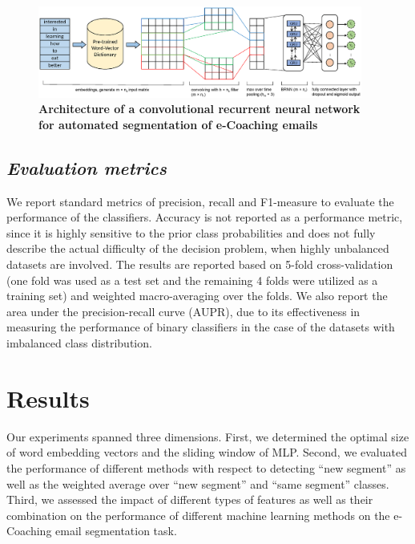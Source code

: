 \documentclass{amia}
\begin{document}
\begin{figure}[!htb]
    \centering
    \includegraphics[width=0.95\textwidth]{figures/CRNN.eps}
    \caption{\textbf{Architecture of a convolutional recurrent neural network for automated segmentation of e-Coaching emails}}
    \label{fig:crnn}
\end{figure}
  
\subsection*{\textit{Evaluation metrics}}
We report standard metrics of precision, recall and F1-measure to evaluate the performance of the classifiers.\cite{aas1999text} Accuracy is not reported as a performance metric, since it is highly sensitive to the prior class probabilities and does not fully describe the actual difficulty of the decision problem, when highly unbalanced datasets are involved. The results are reported based on 5-fold cross-validation (one fold was used as a test set and the remaining 4 folds were utilized as a training set) and weighted macro-averaging over the folds. We also report the area under the precision-recall curve (AUPR), due to its effectiveness in measuring the performance of binary classifiers in the case of the datasets with imbalanced class distribution.\cite{davis2006relationship}

\section*{Results}
Our experiments spanned three dimensions. First, we determined the optimal size of word embedding vectors and the sliding window of MLP. Second, we evaluated the performance of different methods with respect to detecting ``new segment'' as well as the weighted average over ``new segment'' and ``same segment'' classes. Third, we assessed the impact of different types of features as well as their combination on the performance of different machine learning methods on the e-Coaching email segmentation task.
\end{document}
